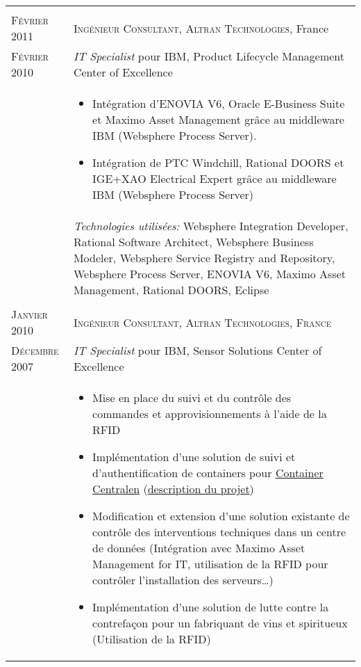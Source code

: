 \begin{longtable}{R{2.5cm}|p{14.8cm}}
  \\
 	\textsc{Février 2011} & \textsc{Ingénieur Consultant, Altran Technologies}, France\\
 	\textsc{Février 2010}& \emph{IT Specialist} pour IBM, Product Lifecycle Management Center of Excellence\\&
  \vspace{-1em}
 	\footnotesize{
 		\begin{itemize}
 			\item Intégration d'ENOVIA V6, Oracle E-Business Suite et Maximo Asset Management grâce au middleware IBM (Websphere Process Server).
 			\item Intégration de PTC Windchill, Rational DOORS et IGE+XAO Electrical Expert grâce au middleware IBM (Websphere Process Server)
 		\end{itemize}
 		\vspace{-1em}
 	}\\&
 	\footnotesize{\emph{Technologies utilisées:} Websphere Integration Developer, Rational Software Architect, Websphere Business Modeler, Websphere Service Registry and Repository, 
 	Websphere Process Server, ENOVIA V6, Maximo Asset Management, Rational DOORS, Eclipse }\\
  \\
 	\textsc{Janvier 2010} & \textsc{Ingénieur Consultant, Altran Technologies, France}\\
 	\textsc{Décembre 2007}& \emph{IT Specialist} pour IBM, Sensor Solutions Center of Excellence\\&
  \vspace{-1em}
 	\footnotesize{
 		\begin{itemize}
 		  \item Mise en place du suivi et du contrôle des commandes et approvisionnements à l'aide de la RFID
 		  \item Implémentation d'une solution de suivi et d'authentification de containers pour \href{http://www.container-centralen.com/}{Container Centralen} (\href{http://www.container-centralen.co.uk/rfid/history.aspx}{description du projet})
 		  \item Modification et extension d'une solution existante de contrôle des interventions techniques dans un centre de données 
 	 	(Intégration avec Maximo Asset Management for IT, utilisation de la RFID pour contrôler l'installation des serveurs\ldots)
 	 	  \item Implémentation d'une solution de lutte contre la contrefaçon pour un fabriquant de vins et spiritueux (Utilisation de la RFID)

\end{itemize}}
\end{longtable}
